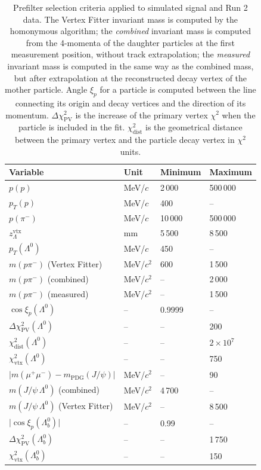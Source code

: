 \begin{table}[t]
	\begin{center}
	\begin{tabular}{@{}llll@{}}
		\toprule
		Variable & Unit & Minimum & Maximum \\
		\midrule
		$p(p)$ 						& MeV/$c$ 	& 2\,000	& 500\,000 \\
		$p_T(p)$ 					& MeV/$c$ 	& 400		& -- \\
		$p(\pi^-)$ 					& MeV/$c$ 	& 10\,000	& 500\,000 \\
		$z_\Lambda^\text{vtx}$		& mm		& 5\,500	& 8\,500 \\
		$p_T(\Lambda^0)$ 			& MeV/$c$ 	& 450		& -- \\
		$m(p\pi^-)$	(Vertex Fitter)	& MeV/$c^2$	& 600		& 1\,500 \\
		$m(p\pi^-)$	(combined)		& MeV/$c^2$	& --		& 2\,000 \\
		$m(p\pi^-)$	(measured)		& MeV/$c^2$	& --		& 1\,500 \\
		$\cos\xi_p (\Lambda^0)$		& --		& 0.9999	& -- \\
		$\Delta \chi^2_\text{PV} (\Lambda^0)$
									& -- 		& --		& 200 \\
		$\chi^2_\text{dist} (\Lambda^0)$
									& --		& --		& $2\times{10}^{7}$ \\
		$\chi^2_\text{vtx} (\Lambda^0)$
									& --		& --		& 750 \\
		$\lvert m(\mu^+ \mu^-) - m_\text{PDG} (J/\psi) \rvert$
									& MeV/$c^2$ & --		& 90 \\
		$m(J/\psi\,\Lambda^0)$ (combined)
									& MeV/$c^2$	& 4\,700		& -- \\
		$m(J/\psi\,\Lambda^0)$ (Vertex Fitter)
									& MeV/$c^2$	& --		& 8\,500 \\
		$\lvert \cos\xi_p (\Lambda^0_b) \rvert$
									& --		& 0.99		& -- \\
		$\Delta \chi^2_\text{PV} (\Lambda^0_b)$
									& -- 		& --		& 1\,750 \\
		$\chi^2_\text{vtx} (\Lambda^0_b)$
									& --		& --		& 150 \\
		\bottomrule
	\end{tabular}
	\end{center}
	\caption{Prefilter selection criteria applied to simulated \demonstratorshort signal and Run 2 data. The Vertex Fitter invariant mass is computed by the homonymous algorithm; the \textit{combined} invariant mass is computed from the 4-momenta of the daughter particles at the first measurement position, without track extrapolation; the \textit{measured} invariant mass is computed in the same way as the combined mass, but after extrapolation at the reconstructed decay vertex of the mother particle. Angle $\xi_p$ for a particle is computed between the line connecting its origin and decay vertices and the direction of its momentum. $\Delta \chi^2_\text{PV}$ is the increase of the primary vertex $\chi^2$ when the particle is included in the fit. $\chi^2_\text{dist}$ is the geometrical distance between the primary vertex and the particle decay vertex in $\chi^2$ units.}
	\label{tab:4:prefilters}
\end{table}

